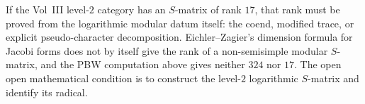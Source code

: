 \begin{remark}[$N = 2$ S-matrix rank $17$ is a separate datum]
\label{rem:as-n-2-s-matrix-rank-17}
%
If the Vol~III level-$2$ category has an $S$-matrix of rank $17$,
that rank must be proved from the logarithmic modular datum itself:
the coend, modified trace, or explicit pseudo-character
decomposition. Eichler--Zagier's dimension formula for Jacobi forms
does not by itself give the rank of a non-semisimple modular
$S$-matrix, and the PBW computation above gives neither $324$ nor
$17$. The open open mathematical condition is to construct the level-$2$
logarithmic $S$-matrix and identify its radical.
\end{remark}
